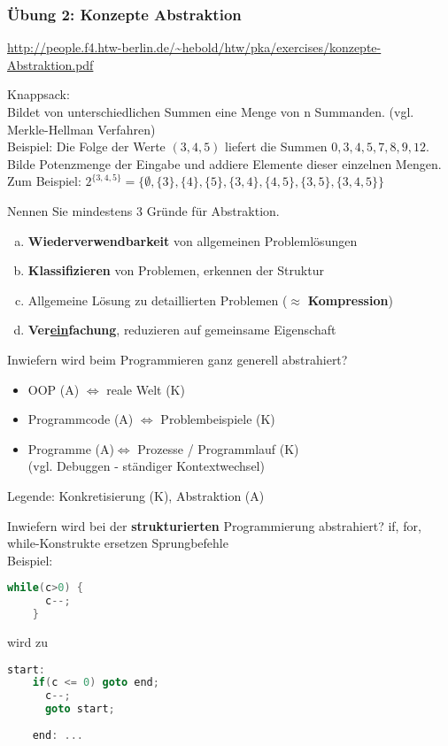\begin{card}
	\frametitle{Übung 2: Konzepte Abstraktion}
	\url{http://people.f4.htw-berlin.de/~hebold/htw/pka/exercises/konzepte-Abstraktion.pdf}
\end{card}

\begin{card}
	Knappsack:\\
	Bildet von unterschiedlichen Summen eine Menge von n Summanden. (vgl. Merkle-Hellman Verfahren)\\
	Beispiel: Die Folge der Werte $( 3, 4, 5 )$ liefert die Summen $0, 3, 4, 5, 7, 8, 9, 12$.
	\hr
	Bilde Potenzmenge der Eingabe und addiere Elemente dieser einzelnen Mengen.\\
	Zum Beispiel: $2^{\{ 3, 4, 5 \}} = \{\emptyset, \{3\}, \{4\}, \{5\}, \{3,4\}, \{4,5\}, \{3,5\}, \{3,4,5\} \}$
\end{card}

\begin{card}
	Nennen Sie mindestens 3 Gründe für Abstraktion.
	\hr
	\begin{enumerate}[a)]
	\item \textbf{Wiederverwendbarkeit} von allgemeinen Problemlösungen
	\item \textbf{Klassifizieren} von Problemen, erkennen der Struktur
	\item Allgemeine Lösung zu detaillierten Problemen ($\approx$ \textbf{Kompression})
	\item \textbf{Ver\uline{ein}fachung}, reduzieren auf gemeinsame Eigenschaft
	\end{enumerate}
\end{card}

\begin{card}
	Inwiefern wird beim Programmieren ganz generell abstrahiert?
	\hr
	\begin{itemize}
	\item OOP (A) $\Leftrightarrow$ reale Welt (K)
	\item Programmcode (A) $\Leftrightarrow$ Problembeispiele (K)
	\item Programme (A)$\Leftrightarrow$ Prozesse / Programmlauf (K)\\(vgl. Debuggen - ständiger Kontextwechsel)
	\end{itemize}
	Legende: Konkretisierung (K), Abstraktion (A)
\end{card}

\begin{card}
	Inwiefern wird bei der \textbf{strukturierten} Programmierung abstrahiert?
	\hr
	if, for, while-Konstrukte ersetzen Sprungbefehle\\
	Beispiel: 
	\begin{lstlisting}[language=C]
	while(c>0) {
	  c--;
	}
	\end{lstlisting}
	wird zu 
	\begin{lstlisting}[language=C]
	start:
	if(c <= 0) goto end;
	  c--;
	  goto start;
	
	end: ...
	\end{lstlisting}
\end{card}

